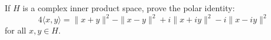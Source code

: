 If $H$ is a complex inner product space, prove the polar identity:
$$4\langle x, y \rangle = \|x + y\|^2 - \|x - y\|^2 + i\|x + iy\|^2 - i\|x - iy\|^2$$
for all $x, y \in H$.
